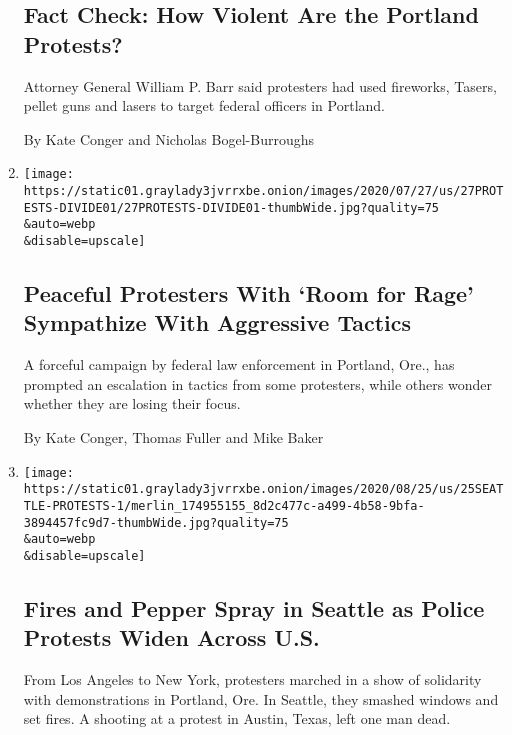 \begin{enumerate}
  \hypertarget{fact-check-how-violent-are-the-portland-protests}{%
  \subsection{Fact Check: How Violent Are the Portland
  Protests?}\label{fact-check-how-violent-are-the-portland-protests}}

  Attorney General William P. Barr said protesters had used fireworks,
  Tasers, pellet guns and lasers to target federal officers in Portland.

  By Kate Conger and Nicholas Bogel-Burroughs
\item
  \href{/2020/07/27/us/protests-divisions-blm.html}{}

  \texttt{[image: https://static01.graylady3jvrrxbe.onion/images/2020/07/27/us/27PROTESTS-DIVIDE01/27PROTESTS-DIVIDE01-thumbWide.jpg?quality=75\\\&auto=webp\\\&disable=upscale]}

  \hypertarget{peaceful-protesters-with-room-for-rage-sympathize-with-aggressive-tactics}{%
  \subsection{Peaceful Protesters With `Room for Rage' Sympathize With
  Aggressive
  Tactics}\label{peaceful-protesters-with-room-for-rage-sympathize-with-aggressive-tactics}}

  A forceful campaign by federal law enforcement in Portland, Ore., has
  prompted an escalation in tactics from some protesters, while others
  wonder whether they are losing their focus.

  By Kate Conger, Thomas Fuller and Mike Baker
\item
  \href{/2020/07/25/us/protests-seattle-portland.html}{}

  \texttt{[image: https://static01.graylady3jvrrxbe.onion/images/2020/08/25/us/25SEATTLE-PROTESTS-1/merlin\_174955155\_8d2c477c-a499-4b58-9bfa-3894457fc9d7-thumbWide.jpg?quality=75\\\&auto=webp\\\&disable=upscale]}

  \hypertarget{fires-and-pepper-spray-in-seattle-as-police-protests-widen-across-us}{%
  \subsection{Fires and Pepper Spray in Seattle as Police Protests Widen
  Across
  U.S.}\label{fires-and-pepper-spray-in-seattle-as-police-protests-widen-across-us}}

  From Los Angeles to New York, protesters marched in a show of
  solidarity with demonstrations in Portland, Ore. In Seattle, they
  smashed windows and set fires. A shooting at a protest in Austin,
  Texas, left one man dead.


\end{enumerate}
